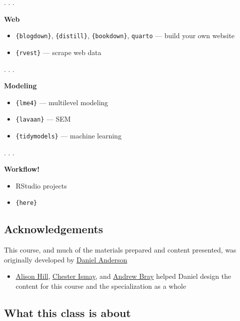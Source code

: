 \documentclass[
  letterpaper,
  DIV=11,
  numbers=noendperiod,
  oneside]{scrartcl}
\providecommand{\tightlist}{%
  \setlength{\itemsep}{0pt}\setlength{\parskip}{0pt}}\usepackage{longtable,booktabs,array}
\begin{document}
. . .

\textbf{Web}

\begin{itemize}
\tightlist
\item
  \texttt{\{blogdown\}}, \texttt{\{distill\}}, \texttt{\{bookdown\}},
  \texttt{quarto} --- build your own website
\item
  \texttt{\{rvest\}} --- scrape web data
\end{itemize}

. . .

\textbf{Modeling}

\begin{itemize}
\tightlist
\item
  \texttt{\{lme4\}} --- multilevel modeling
\item
  \texttt{\{lavaan\}} --- SEM
\item
  \texttt{\{tidymodels\}} --- machine learning
\end{itemize}

. . .

\textbf{Workflow!}

\begin{itemize}
\tightlist
\item
  RStudio projects
\item
  \texttt{\{here\}}
\end{itemize}

\hypertarget{acknowledgements}{%
\subsection{Acknowledgements}\label{acknowledgements}}

This course, and much of the materials prepared and content presented,
was originally developed by \href{www.datalorax.com}{Daniel Anderson}

\begin{itemize}
\tightlist
\item
  \href{https://twitter.com/apreshill}{Alison Hill},
  \href{https://twitter.com/old_man_chester}{Chester Ismay}, and
  \href{https://andrewpbray.github.io/}{Andrew Bray} helped Daniel
  design the content for this course and the specialization as a whole
\end{itemize}

\hypertarget{what-this-class-is-about}{%
\subsection{What this class is about}\label{what-this-class-is-about}}
\end{document}
